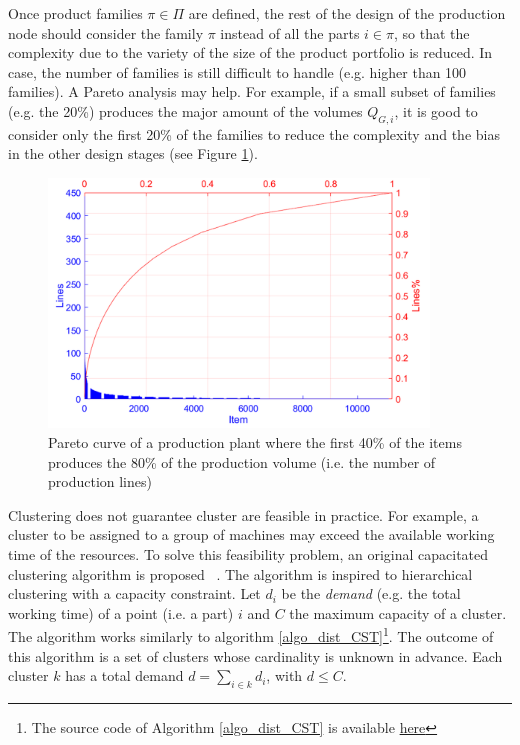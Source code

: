 Once product families $\pi\in\Pi$ are defined, the rest of the design of the production node should consider the family $\pi$ instead of all the parts $i\in\pi$, so that the complexity due to the variety of the size of the product portfolio is reduced. In case, the number of families is still difficult to handle (e.g. higher than 100 families). A Pareto analysis  may help. For example, if a small subset of families (e.g. the 20\%) produces the major amount of the volumes $Q_{G,i}$, it is good to consider only the first 20\% of the families to reduce the complexity and the bias in the other design stages (see Figure \ref{fig_prod_pareto}).

\begin{figure}[hbt!]
\centering
\includegraphics[width=0.9\textwidth]{sectionProduction/design_plant_figures/fig_prod_pareto.png}
\captionsetup{type=figure}
\caption{Pareto curve of a production plant where the first 40\% of the items produces the 80\% of the production volume (i.e. the number of production lines)}
\label{fig_prod_pareto}
\end{figure}

Clustering does not guarantee cluster are feasible in practice. For example, a cluster to be assigned to a group of machines may exceed the available working time of the resources. To solve this feasibility problem, an original capacitated clustering algorithm is proposed ~\cite{Tufano2020ISM}.  The algorithm is inspired to hierarchical clustering with a capacity constraint. Let $d_i$ be the \textit{demand} (e.g. the total working time) of a point (i.e. a part) $i$ and $C$ the maximum capacity of a cluster. The algorithm works similarly to algorithm \ref{algo_dist_CST}\footnote{The source code of Algorithm \ref{algo_dist_CST} is available \href{https://github.com/aletuf93/logproj/blob/master/logproj/ml_unsupervised_models.py}{here}}. The outcome of this algorithm is a set of clusters whose cardinality is unknown in advance. Each cluster $k$ has a total demand $d=\sum_{i\in k} d_i$, with $d\le C$.

